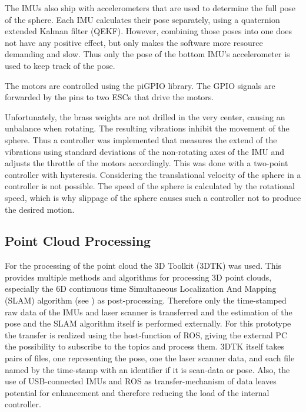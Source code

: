 The IMUs also ship with accelerometers that are used to determine the full pose of the sphere.
Each IMU calculates their pose separately, using a quaternion extended Kalman filter (QEKF).
However, combining those poses into one does not have any positive effect, but only makes the software more resource demanding and slow.
Thus only the pose of the bottom IMU's accelerometer is used to keep track of the pose.

The motors are controlled using the piGPIO library. The GPIO signals are forwarded by the pins to two ESCs that drive the motors. 

Unfortunately, the brass weights are not drilled in the very center, causing an unbalance when rotating.
The resulting vibrations inhibit the movement of the sphere.
Thus a controller was implemented that measures the extend of the vibrations using standard deviations of the non-rotating axes of the IMU and adjusts the throttle of the motors accordingly.
This was done with a two-point controller with hysteresis.
Considering the translational velocity of the sphere in a controller is not possible.
The speed of the sphere is calculated by the rotational speed, which is why slippage of the sphere causes such a controller not to produce the desired motion. 

\subsection{Point Cloud Processing}                                                                                                                                                                                  
\label{sec:TechnicalApproach:pointcloudprocessing}
For the processing of the point cloud the 3D Toolkit (3DTK) was used.
This provides multiple methods and algorithms for processing 3D point clouds, especially the 6D continuous time Simultaneous Localization And Mapping (SLAM) algorithm (see \cite{3DARCH2017_1, LS2019}) as post-processing.
Therefore only the time-stamped raw data of the IMUs and laser scanner is transferred and the estimation of the pose and the SLAM algorithm itself is performed externally.
For this prototype the transfer is realized using the host-function of ROS, giving the external PC the possibility to subscribe to the topics and process them.
3DTK itself takes pairs of files, one representing the pose, one the laser scanner data, and each file named by the time-stamp with an identifier if it is scan-data or pose.
Also, the use of USB-connected IMUs and ROS as transfer-mechanism of data leaves potential for enhancement and therefore reducing the load of the internal controller.
